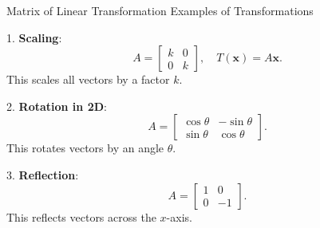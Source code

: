 \documentclass[10pt, aspectratio=169]{beamer}
\begin{document}
\begin{frame}{Matrix of Linear Transformation}
    Examples of Transformations

1. \textbf{Scaling}:
   \[
   A = \begin{bmatrix} k & 0 \\ 0 & k \end{bmatrix}, \quad T(\mathbf{x}) = A\mathbf{x}.
   \]
   This scales all vectors by a factor \( k \).

2. \textbf{Rotation in 2D}:
   \[
   A = \begin{bmatrix} \cos\theta & -\sin\theta \\ \sin\theta & \cos\theta \end{bmatrix}.
   \]
   This rotates vectors by an angle \( \theta \).

3. \textbf{Reflection}:
   \[
   A = \begin{bmatrix} 1 & 0 \\ 0 & -1 \end{bmatrix}.
   \]
   This reflects vectors across the \( x \)-axis.


\end{frame}
\end{document}
